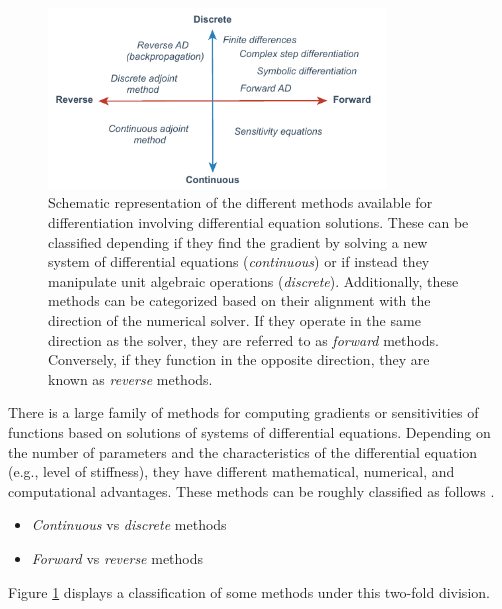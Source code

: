 \begin{figure}[t]
    \centering
    \includegraphics[width=0.80\textwidth]{figures/scheme-methods.pdf}
    \caption{Schematic representation of the different methods available for differentiation involving differential equation solutions. These can be classified depending if they find the gradient by solving a new system of differential equations (\textit{continuous}) or if instead they manipulate unit algebraic operations (\textit{discrete}). Additionally, these methods can be categorized based on their alignment with the direction of the numerical solver. If they operate in the same direction as the solver, they are referred to as \textit{forward} methods. Conversely, if they function in the opposite direction, they are known as \textit{reverse} methods.}
    \label{fig:scheme-all-methods}
\end{figure}

There is a large family of methods for computing gradients or sensitivities of functions based on solutions of systems of differential equations. 
Depending on the number of parameters and the characteristics of the differential equation (e.g., level of stiffness), they have different mathematical, numerical, and computational advantages.
These methods can be roughly classified as follows \cite{ma2021comparison}. 
\begin{itemize}
    \item \textit{Continuous} vs \textit{discrete}  methods
    \item \textit{Forward} vs \textit{reverse} methods
\end{itemize}
Figure \ref{fig:scheme-all-methods} displays a classification of some methods under this two-fold division. 

